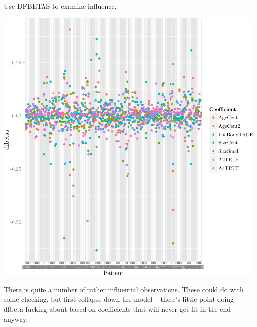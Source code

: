 \documentclass{article}
\begin{document}
Use DFBETAS to examine influence.
\begin{knitrout}
\color{fgcolor}\begin{kframe}
\begin{alltt}
 \hlkwb{=}   \hlstd{=} \hlstd{)}
 \hlkwb{=} \hlopt{$}
 \hlkwb{=} 
 \hlkwb{=} \hlstd{(}\hlstd{,} \hlstd{,} \hlstd{)}
\hlopt{$} \hlkwb{=} \hlstd{(}\hlstd{,} \hlopt{$}
 \hlstd{(}      \hlopt{+} \hlstd{()}
\end{alltt}
\end{kframe}

{\centering \includegraphics[width=\maxwidth]{figure/05-eda-dfbetas-full-1} 

}



\end{knitrout}
There is quite a number of rather influential observations.  These could do with some checking, but first collapse down the model -- there's little point doing dfbeta fucking about based on coefficients that will never get fit in the end anyway.
\end{document}
